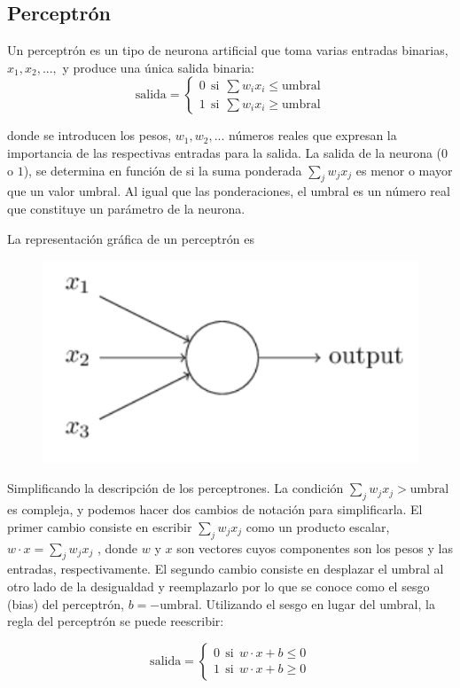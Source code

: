 \subsection{Perceptrón}
Un perceptrón es un tipo de neurona artificial que toma varias entradas binarias, $x_1 , x_2 , . . .,$ y produce una única salida binaria:
\begin{equation}
    \text{salida}=\begin{cases}
    0~~\text{si}~~\sum w_ix_i\leq \text{umbral}\\
    1~~\text{si}~~\sum w_ix_i\geq\text{umbral}
    \end{cases}
\end{equation}

donde se introducen los pesos, $w_1, w_2 , ...$ números reales que expresan la importancia de las respectivas entradas para la salida. La salida de la neurona ($0$ o $1$), se determina en función de si la suma ponderada $\sum_j w_j x_j$ es menor o mayor que un valor umbral. Al igual que las ponderaciones, el umbral es un número real que constituye un parámetro de la neurona. 

La representación gráfica de un perceptrón es 
\begin{figure}[h!]
    \centering
    \includegraphics[width=0.25\linewidth]{imagen.png}
\end{figure}



Simplificando la descripción de los perceptrones. La condición $
\sum_j w_j x_j > \text{umbral}$ es compleja, y podemos hacer dos cambios de notación para simplificarla. El primer cambio consiste en escribir $\sum_j w_jx_j$ como un producto escalar, $w \cdot x = \sum_j w_j x_j$ , donde $w$ y $x$ son vectores cuyos componentes son los pesos y las entradas, respectivamente. El segundo cambio consiste en desplazar el umbral al otro lado de la desigualdad y reemplazarlo por lo que se conoce como el sesgo (bias) del perceptrón, $b = - \text{umbral}$. Utilizando el sesgo en lugar del umbral, la regla del perceptrón se puede reescribir:

\begin{equation}
    \text{salida}=\begin{cases}
    0~~\text{si}~~w\cdot x +b\leq 0\\
    1~~\text{si}~~w\cdot x+b\geq 0
    \end{cases}
\end{equation}




